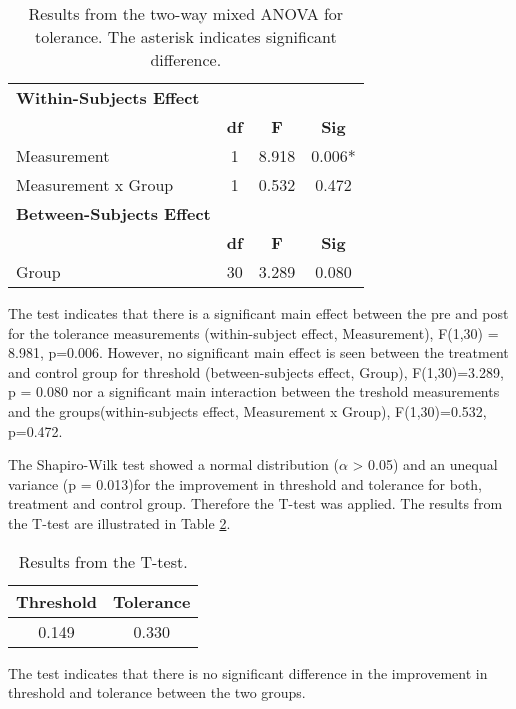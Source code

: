\begin{table}[ht]
\caption{Results from the two-way mixed ANOVA for tolerance. The asterisk indicates significant difference.}
\centering
\begin{tabular}{l c c c}
\hline \hline
\textbf{Within-Subjects Effect} \\ 
& \textbf{df} & \textbf{F} & \textbf{Sig} \\ [0.5ex] %
\hline
Measurement & 1 &  8.918 &  0.006* \\
Measurement x Group & 1 & 0.532 & 0.472 \\
\hline \hline
\textbf{Between-Subjects Effect} \\ 
 & \textbf{df} & \textbf{F} & \textbf{Sig} \\ [0.5ex] %
\hline
Group & 30 & 3.289 &  0.080 \\
\hline
\end{tabular}
\label{table:TWOWAYANOVA2}
\end{table}

\noindent
The test indicates that there is a significant main effect between the pre and post for the tolerance measurements (within-subject effect, Measurement), F(1,30) = 8.981, p=0.006. However, no significant main effect is seen between the treatment and control group for threshold (between-subjects effect, Group), F(1,30)=3.289, p = 0.080 nor a significant main interaction between the treshold measurements and the groups(within-subjects effect, Measurement x Group), F(1,30)=0.532, p=0.472. 

The Shapiro-Wilk test showed a normal distribution ($\alpha$ > 0.05) and an unequal variance (p = 0.013)for the improvement in threshold and tolerance for both, treatment and control group. Therefore the T-test was applied. The results from the T-test are illustrated in Table \ref{table:TTEST}. 

\begin{table}[ht]
\caption{Results from the T-test.}
\centering
\begin{tabular}{c c}
\hline\hline
\textbf{Threshold} & \textbf{Tolerance} \\ [0.5ex] %
\hline
 0.149 &  0.330 \\
\hline
\end{tabular}
\label{table:TTEST}
\end{table}

\noindent
The test indicates that there is no significant difference in the improvement in threshold and tolerance between the two groups.